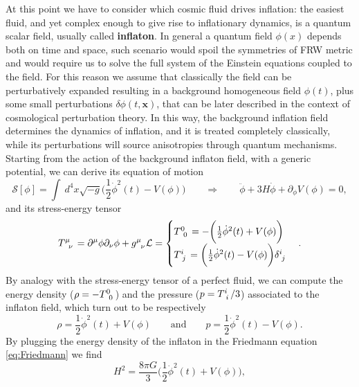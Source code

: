 At this point we have to consider which cosmic fluid drives inflation: the easiest fluid, and yet complex enough to give rise to inflationary dynamics, is a quantum scalar field, usually called \textbf{inflaton}. In general a quantum field $\phi(x)$ depends both on time and space, such scenario would spoil the symmetries of FRW metric and would require us to solve the full system of the Einstein equations coupled to the field. For this reason we assume that classically the field can be perturbatively expanded resulting in a background homogeneous field $\phi(t)$, plus some small perturbations $\delta \phi(t,\mathbf x)$, that can be later described in the context of cosmological perturbation theory. In this way, the background  inflation field determines the dynamics of inflation, and it is treated completely classically, while its perturbations will source anisotropies through quantum mechanisms.\\
Starting from the action of the background inflaton field, with a generic potential, we can derive its equation of motion
\begin{equation}
    \mathcal{S}[\phi]=\int\ d^4x\sqrt{-g}\bigg(\frac{1}{2}\dot\phi^2(t)-V(\phi)\bigg)\qquad\Rightarrow\qquad\ddot\phi+3H\dot \phi+\partial_\phi V(\phi)=0,\label{eq:motion_inflaton}
\end{equation}
and its stress-energy tensor
\begin{equation}
   \tensor{T}{^\mu_\nu}=\partial^\mu\phi\partial_\nu\phi+\tensor{g}{^\mu_\nu}\mathcal{L}=
   \begin{cases}
    \tensor{T}{^0_0}=-\bigg(\frac{1}{2}\dot\phi^2(t)+V(\phi)\bigg)\\
    \tensor{T}{^i_j}=\bigg(\frac{1}{2}\dot\phi^2(t)-V(\phi)\bigg)\tensor{\delta}{^i_j}\\
   \end{cases}.
\end{equation}
By analogy with the stress-energy tensor of a perfect fluid, we can compute the energy density ($\rho=-\tensor{T}{^0_0}$) and the pressure ($p=\tensor{T}{^i_i}/3$) associated to the inflaton field, which turn out to be respectively
\begin{equation}
    \label{eq_rho_p_inflaton}
    \rho=\frac{1}{2}\dot\phi^2(t)+V(\phi)\qquad\text{and}\qquad p=\frac{1}{2}\dot\phi^2(t)-V(\phi).
\end{equation}
By plugging the energy density of the inflaton in the Friedmann equation \eqref{eq:Friedmann} we find
\begin{equation}
    H^2=\frac{8\pi G}{3}\bigg(\frac{1}{2}\dot\phi^2(t)+V(\phi)\bigg),
    \label{eq:Friedmann_inflaton}
\end{equation}
